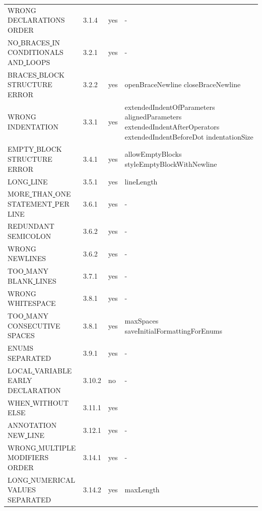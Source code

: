 \begin{center}
\begin{longtable}{ |l|p{0.8cm}|p{0.8cm}| p{3cm} | }
WRONG\underline{ }DECLARATIONS\underline{ }ORDER & 3.1.4 &  yes  &  -                         \\
NO\underline{ }BRACES\underline{ }IN\underline{ }CONDITIONALS\underline{ }AND\underline{ }LOOPS & 3.2.1 &  yes  &                          - \\
BRACES\underline{ }BLOCK\underline{ }STRUCTURE\underline{ }ERROR & 3.2.2 &  yes  &  openBraceNewline closeBraceNewline \\
WRONG\underline{ }INDENTATION & 3.3.1 &  yes  & extendedIndentOfParameters alignedParameters extendedIndentAfterOperators extendedIndentBeforeDot indentationSize  \\
EMPTY\underline{ }BLOCK\underline{ }STRUCTURE\underline{ }ERROR & 3.4.1 &  yes  &  allowEmptyBlocks styleEmptyBlockWithNewline \\
LONG\underline{ }LINE & 3.5.1 &  yes  &  lineLength                \\
MORE\underline{ }THAN\underline{ }ONE\underline{ }STATEMENT\underline{ }PER\underline{ }LINE & 3.6.1 &  yes  &                          - \\
REDUNDANT\underline{ }SEMICOLON & 3.6.2 &  yes  &                          - \\
WRONG\underline{ }NEWLINES & 3.6.2 &  yes  &                          - \\
TOO\underline{ }MANY\underline{ }BLANK\underline{ }LINES & 3.7.1 &  yes  &                                                                                     - \\
WRONG\underline{ }WHITESPACE & 3.8.1 &  yes  &                          - \\
TOO\underline{ }MANY\underline{ }CONSECUTIVE\underline{ }SPACES & 3.8.1 &  yes  &  maxSpaces saveInitialFormattingForEnums \\
ENUMS\underline{ }SEPARATED & 3.9.1 &  yes  & -                          \\
LOCAL\underline{ }VARIABLE\underline{ }EARLY\underline{ }DECLARATION & 3.10.2 &  no  &                           -  \\
WHEN\underline{ }WITHOUT\underline{ }ELSE & 3.11.1 &  yes  &  \\
ANNOTATION\underline{ }NEW\underline{ }LINE & 3.12.1 &  yes  &  - \\
WRONG\underline{ }MULTIPLE\underline{ }MODIFIERS\underline{ }ORDER & 3.14.1 &  yes  &  -                         \\
LONG\underline{ }NUMERICAL\underline{ }VALUES\underline{ }SEPARATED & 3.14.2 &  yes  &  maxLength                 \\

\end{longtable}
\end{center}
